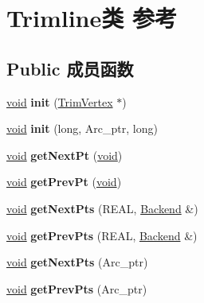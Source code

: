 \hypertarget{class_trimline}{}\section{Trimline类 参考}
\label{class_trimline}
\subsection*{Public 成员函数}
\begin{DoxyCompactItemize}
\item 
\mbox{\label{class_trimline_ab9d8a2fd9c7f036fc39ceded64572022}} 
\hyperlink{interfacevoid}{void} {\bfseries init} (\hyperlink{class_trim_vertex}{Trim\+Vertex} $\ast$)
\item 
\mbox{\label{class_trimline_a1778d393b88c3b0fb55b93f430440de6}} 
\hyperlink{interfacevoid}{void} {\bfseries init} (long, Arc\+\_\+ptr, long)
\item 
\mbox{\label{class_trimline_a9a41dbccb140f614a01f751e0e25cd26}} 
\hyperlink{interfacevoid}{void} {\bfseries get\+Next\+Pt} (\hyperlink{interfacevoid}{void})
\item 
\mbox{\label{class_trimline_aaf92d55f4c87dc7ca0b155ef3b53d7b2}} 
\hyperlink{interfacevoid}{void} {\bfseries get\+Prev\+Pt} (\hyperlink{interfacevoid}{void})
\item 
\mbox{\label{class_trimline_a4ed1e26ccb2179702c3cf4700d2e0742}} 
\hyperlink{interfacevoid}{void} {\bfseries get\+Next\+Pts} (R\+E\+AL, \hyperlink{class_backend}{Backend} \&)
\item 
\mbox{\label{class_trimline_ad9dcd19f7f57790b4bc7dbe6742c766e}} 
\hyperlink{interfacevoid}{void} {\bfseries get\+Prev\+Pts} (R\+E\+AL, \hyperlink{class_backend}{Backend} \&)
\item 
\mbox{\label{class_trimline_a755bf628b3d00116b05b62a8c6d472c6}} 
\hyperlink{interfacevoid}{void} {\bfseries get\+Next\+Pts} (Arc\+\_\+ptr)
\item 
\mbox{\label{class_trimline_a3e90e65be89c11ee93476e7a5bafe664}} 
\hyperlink{interfacevoid}{void} {\bfseries get\+Prev\+Pts} (Arc\+\_\+ptr)

\end{DoxyCompactItemize}
